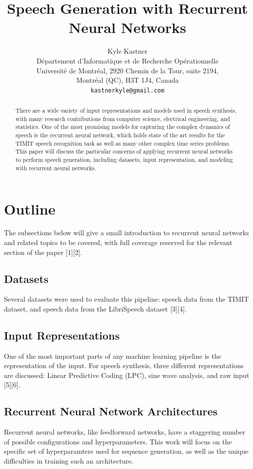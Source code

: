 \documentclass{article} %
\title{Speech Generation with Recurrent Neural Networks}
\author{
Kyle Kastner\\
Département d’Informatique et de Recherche Opérationnelle\\
Université de Montréal, 2920 Chemin de la Tour, suite 2194,\\
Montréal (QC), H3T 1J4, Canada\\
\texttt{kastnerkyle@gmail.com} \\
}
\begin{document}
\maketitle

\begin{abstract}
There are a wide variety of input 
representations and models used in speech
synthesis, with many research contributions from computer science, electrical
engineering, and statistics. One of the most promising models for capturing the
complex dynamics of speech is the recurrent neural network,
which holds state of the art results for the TIMIT speech recognition
task as well as many other complex time series problems. This paper will
discuss the particular concerns of applying recurrent neural networks to
perform speech generation, including datasets,
input representation, and modeling with recurrent neural networks.
\end{abstract}

\section{Outline}
The subsections below will
give a small introduction to recurrent neural networks and related topics
to be covered, with full coverage
reserved for the relevant section of the paper [1][2].

\subsection{Datasets}
Several datasets were used to evaluate this pipeline: speech data from the
TIMIT dataset, and speech data from the LibriSpeech dataset [3][4].

\subsection{Input Representations}
One of the most important parts of any machine learning pipeline is the
representation of the input. For speech synthesis, three different
representations are discussed: Linear Predictive Coding (LPC), sine wave
analysis, and raw input [5][6]. 

\subsection{Recurrent Neural Network Architectures}
Recurrent neural networks, like feedforward networks, have a staggering
number of possible configurations and hyperparameters. This work will focus on the
specific set of hyperparamters used for sequence generation,
as well as the unique difficulties in training such an architecture.
\end{document}
